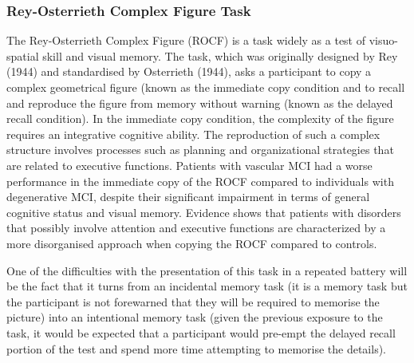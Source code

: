 \documentclass[12pt, twoside, a4paper]{article}
\begin{document}
\subsubsection{Rey-Osterrieth Complex Figure Task}
The Rey-Osterrieth Complex Figure (ROCF) is a task widely as a test of visuo-spatial skill and visual memory. The task, which was originally designed by Rey (1944) and standardised by Osterrieth (1944), asks a participant to copy a complex geometrical figure (known as the immediate copy condition and to recall and reproduce the figure from memory without warning (known as the delayed recall condition). In the immediate copy condition, the complexity of the figure requires an integrative cognitive ability. The reproduction of such a complex structure involves processes such as planning and organizational strategies that are related to executive functions.
Patients with vascular MCI had a worse performance in the immediate copy of the ROCF compared to individuals with degenerative MCI, despite their significant impairment in terms of general cognitive status and visual memory. Evidence shows that patients with disorders that possibly involve attention and executive functions are characterized by a more disorganised approach when copying the ROCF compared to controls.

One of the difficulties with the presentation of this task in a repeated battery will be the fact that it turns from an incidental memory task (it is a memory task but the participant is not forewarned that they will be required to memorise the picture) into an intentional memory task (given the previous exposure to the task, it would be expected that a participant would pre-empt the delayed recall portion of the test and spend more time attempting to memorise the details). 
\end{document}
